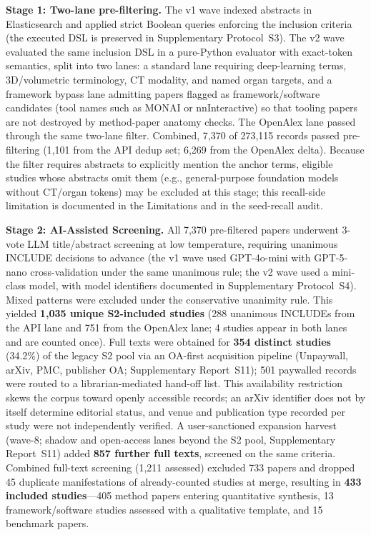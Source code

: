 \textbf{Stage 1: Two-lane pre-filtering.} The v1 wave indexed abstracts in Elasticsearch and applied strict Boolean queries enforcing the inclusion criteria (the executed DSL is preserved in Supplementary Protocol~S3). The v2 wave evaluated the same inclusion DSL in a pure-Python evaluator with exact-token semantics, split into two lanes: a standard lane requiring deep-learning terms, 3D/volumetric terminology, CT modality, and named organ targets, and a framework bypass lane admitting papers flagged as framework/software candidates (tool names such as MONAI or nnInteractive) so that tooling papers are not destroyed by method-paper anatomy checks. The OpenAlex lane passed through the same two-lane filter. Combined, 7{,}370 of 273{,}115 records passed pre-filtering (1{,}101 from the API dedup set; 6{,}269 from the OpenAlex delta). Because the filter requires abstracts to explicitly mention the anchor terms, eligible studies whose abstracts omit them (e.g., general-purpose foundation models without CT/organ tokens) may be excluded at this stage; this recall-side limitation is documented in the Limitations and in the seed-recall audit.

\textbf{Stage 2: AI-Assisted Screening.} All 7{,}370 pre-filtered papers underwent 3-vote LLM title/abstract screening at low temperature, requiring unanimous INCLUDE decisions to advance (the v1 wave used GPT-4o-mini with GPT-5-nano cross-validation under the same unanimous rule; the v2 wave used a mini-class model, with model identifiers documented in Supplementary Protocol~S4). Mixed patterns were excluded under the conservative unanimity rule. This yielded \textbf{1{,}035 unique S2-included studies} (288 unanimous INCLUDEs from the API lane and 751 from the OpenAlex lane; 4 studies appear in both lanes and are counted once). Full texts were obtained for \textbf{354 distinct studies} (34.2\%) of the legacy S2 pool via an OA-first acquisition pipeline (Unpaywall, arXiv, PMC, publisher OA; Supplementary Report~S11); 501 paywalled records were routed to a librarian-mediated hand-off list. This availability restriction skews the corpus toward openly accessible records; an arXiv identifier does not by itself determine editorial status, and venue and publication type recorded per study were not independently verified. A user-sanctioned expansion harvest (wave-8; shadow and open-access lanes beyond the S2 pool, Supplementary Report~S11) added \textbf{857 further full texts}, screened on the same criteria. Combined full-text screening (1{,}211 assessed) excluded 733 papers and dropped 45 duplicate manifestations of already-counted studies at merge, resulting in \textbf{433 included studies}---405 method papers entering quantitative synthesis, 13 framework/software studies assessed with a qualitative template, and 15 benchmark papers.

